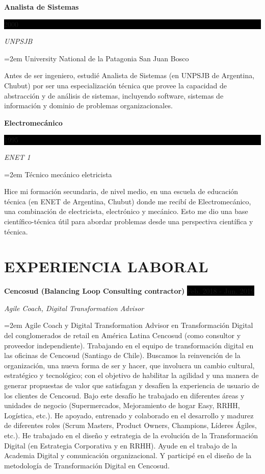 \documentclass[paper=a4,fontsize=11pt]{scrartcl} %
\newcommand{\sepspace}{\vspace*{1em}}		%
\newcommand{\NewPart}[1]{\section*{\uppercase{#1}}}
\newcommand{\EducationEntry}[4]{
		\noindent \textbf{#1} \hfill      %
		\colorbox{Black}{%
			\parbox{6em}{%
			\hfill\color{White}#2}} \par  %
		\noindent \textit{#3} \par        %
		\noindent\hangindent=2em\hangafter=0 \small #4 %
		\normalsize \par}
\newcommand{\WorkEntry}[4]{				  %
		\noindent \textbf{#1} \hfill      %
		\colorbox{Black}{\color{White}#2} \par  %
		\noindent \textit{#3} \par              %
		\noindent\hangindent=2em\hangafter=0 \small #4 %
		\normalsize \par}
\begin{document}
\EducationEntry{Analista de Sistemas}{2000}{UNPSJB}
{University National de la Patagonia San Juan Bosco}

Antes de ser ingeniero, estudié Analista de Sistemas (en UNPSJB de Argentina, Chubut) por ser una especialización técnica que provee la capacidad de abstracción y de análisis de sistemas, incluyendo software, sistemas de información y dominio de problemas organizacionales. 
\sepspace

\EducationEntry{Electromecánico}{1995}{ENET 1}
{Técnico mecánico eletricista}

Hice mi formación secundaria, de nivel medio, en una escuela de educación técnica (en ENET de Argentina, Chubut) donde me recibí de Electromecánico, una combinación de electricista, electrónico y mecánico. Esto me dio una base científico-técnica útil para abordar problemas desde una perspectiva científica y técnica.
\sepspace

\NewPart{Experiencia laboral}{}

\WorkEntry{Cencosud (Balancing Loop Consulting contractor)}{Feb. 2018 - Jun. 2019}{Agile Coach, Digital Transformation Advisor}{
Agile Coach y Digital Transformation Advisor en Transformación Digital del conglomerados de retail en América Latina Cencosud (como consultor y proveedor independiente). Trabajando en el equipo de transformación digital en las oficinas de Cencosud (Santiago de Chile). Buscamos la reinvención de la organización, una nueva forma de ser y hacer, que involucra un cambio cultural, estratégico y tecnológico; con el objetivo de habilitar la agilidad y una manera de generar propuestas de valor que satisfagan y desafíen la experiencia de usuario de los clientes de Cencosud. Bajo este desafío he trabajado en diferentes áreas y unidades de negocio (Supermercados, Mejoramiento de hogar Easy, RRHH, Logística, etc.). He apoyado, entrenado y colaborado en el desarrollo y madurez de diferentes roles (Scrum Masters, Product Owners, Champions, Líderes Ágiles, etc.). He trabajado en el diseño y estrategia de la evolución de la Transformación Digital (en Estrategia Corporativa y en RRHH). Ayude en el trabajo de la Academia Digital y comunicación organizacional. Y participé en el diseño de la metodología de Transformación Digital en Cencosud.
}
\end{document}
